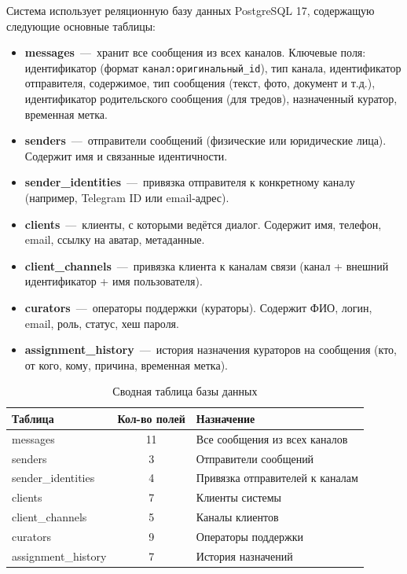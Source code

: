 \documentclass[12pt,a4paper]{report}
\begin{document}
Система использует реляционную базу данных PostgreSQL 17, содержащую следующие основные таблицы:

\begin{itemize}
    \item \textbf{messages}~---~хранит все сообщения из всех каналов. Ключевые поля: идентификатор (формат \texttt{канал:оригинальный\_id}), тип канала, идентификатор отправителя, содержимое, тип сообщения (текст, фото, документ и т.д.), идентификатор родительского сообщения (для тредов), назначенный куратор, временная метка.
    \item \textbf{senders}~---~отправители сообщений (физические или юридические лица). Содержит имя и связанные идентичности.
    \item \textbf{sender\_identities}~---~привязка отправителя к конкретному каналу (например, Telegram ID или email-адрес).
    \item \textbf{clients}~---~клиенты, с которыми ведётся диалог. Содержит имя, телефон, email, ссылку на аватар, метаданные.
    \item \textbf{client\_channels}~---~привязка клиента к каналам связи (канал + внешний идентификатор + имя пользователя).
    \item \textbf{curators}~---~операторы поддержки (кураторы). Содержит ФИО, логин, email, роль, статус, хеш пароля.
    \item \textbf{assignment\_history}~---~история назначения кураторов на сообщения (кто, от кого, кому, причина, временная метка).
\end{itemize}

\begin{center}
\begin{table}[ht]
\centering
\caption{Сводная таблица базы данных}
\label{tab:db_schema}
\begin{tabularx}{\textwidth}{|X|c|X|}
\hline
\textbf{Таблица} & \textbf{Кол-во полей} & \textbf{Назначение} \\ \hline
messages & 11 & Все сообщения из всех каналов \\ \hline
senders & 3 & Отправители сообщений \\ \hline
sender\_identities & 4 & Привязка отправителей к каналам \\ \hline
clients & 7 & Клиенты системы \\ \hline
client\_channels & 5 & Каналы клиентов \\ \hline
curators & 9 & Операторы поддержки \\ \hline
assignment\_history & 7 & История назначений \\ \hline
\end{tabularx}
\end{table}
\end{center}
\end{document}
